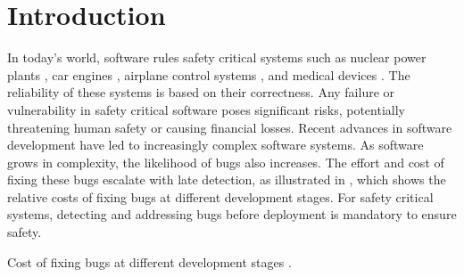 \setchapterpreamble[u]{\margintoc}


\chapter{Introduction}

\marginemptybox{4cm}
In today's world, software rules safety critical systems such as nuclear power plants ,
car engines ,
airplane control systems
,
and medical devices .
The reliability of these systems is based on their correctness.
Any failure or vulnerability in safety critical software poses significant risks, potentially threatening human safety or causing financial losses.
Recent advances in software development have led to increasingly complex software systems.
As software grows in complexity, the likelihood of bugs also increases.
The effort and cost of fixing these bugs escalate with late detection, as illustrated in  , which shows the relative costs of fixing bugs at different development stages.
For safety critical systems, detecting and addressing bugs before deployment is mandatory to ensure safety.

\begin{margintable}
  \caption{Cost of fixing bugs at different development stages \cite{White2017}.}
  \centering
\end{margintable}



